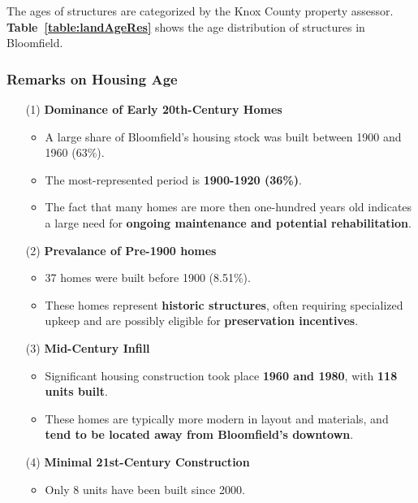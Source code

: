 \noindent The ages of structures are categorized by the Knox County property assessor. \textbf{Table~\ref{table:landAgeRes}} shows the age distribution of structures in Bloomfield.\\



\pagebreak
\subsubsection*{Remarks on Housing Age}
\begin{itemize}
    \item [(1)] \textbf{\textcolor{coBalt}{Dominance of Early 20th-Century Homes}}
    \begin{itemize}
        \item A large share of Bloomfield's housing stock was built between 1900 and 1960 (63\%).
        \item The most-represented period is \textbf{1900-1920 (36\%)}.
        \item The fact that many homes are more then one-hundred years old indicates a large need for \textbf{ongoing maintenance and potential rehabilitation}.
    \end{itemize}
    \item [(2)] \textbf{\textcolor{coBalt}{Prevalance of Pre-1900 homes}}
    \begin{itemize}
        \item 37 homes were built before 1900 (8.51\%).
        \item These homes represent \textbf{historic structures}, often requiring specialized upkeep and are possibly eligible for \textbf{preservation incentives}.
    \end{itemize}
    \item [(3)] \textbf{\textcolor{coBalt}{Mid-Century Infill}}
    \begin{itemize}
        \item Significant housing construction took place \textbf{1960 and 1980}, with \textbf{118 units built}.
        \item These homes are typically more modern in layout and materials, and \textbf{tend to be located away from Bloomfield's downtown}.
    \end{itemize}
    \item [(4)] \textbf{\textcolor{coBalt}{Minimal 21st-Century Construction}}
    \begin{itemize}
        \item Only 8 units have been built since 2000.

\end{itemize}
\end{itemize}
